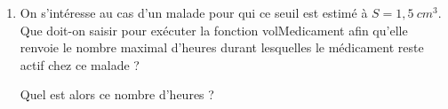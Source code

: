 \documentclass[10pt]{article}
\providecommand{\np}[2][]{{#2~#1}}
\begin{document}
\begin{enumerate}
\begin{enumerate}
		\item On s'intéresse au cas d'un malade pour qui ce seuil est estimé à $S = \np[cm^3]{1,5}$.
Que doit-on saisir pour exécuter la fonction volMedicament afin qu'elle renvoie 
le nombre maximal d'heures durant lesquelles le médicament reste actif chez ce malade ?


Quel est alors ce nombre d'heures ?

	\end{enumerate}
\end{enumerate}

\vspace{0,5cm}
\end{document}
